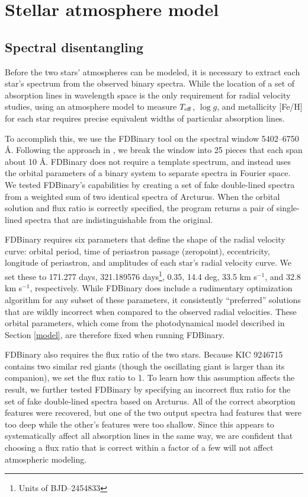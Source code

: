 \section{Stellar atmosphere model}\label{atm}

\subsection{Spectral disentangling}\label{disentangle}
Before the two stars' atmospheres can be modeled, it is necessary to extract each star's spectrum from the observed binary spectra. While the location of a set of absorption lines in wavelength space is the only requirement for radial velocity studies, using an atmosphere model to measure $T_{\rm{eff}}$, $\log g$, and metallicity [Fe/H] for each star requires precise equivalent widths of particular absorption lines.

To accomplish this, we use the FDBinary tool \citep{ili04} on the spectral window 5402--6750 \AA. Following the approach in \citet{bec14}, we break the window into 25 pieces that each span about 10 \AA. FDBinary does not require a template spectrum, and instead uses the orbital parameters of a binary system to separate spectra in Fourier space. We tested FDBinary's capabilities by creating a set of fake double-lined spectra from a weighted sum of two identical spectra of Arcturus. When the orbital solution and flux ratio is correctly specified, the program returns a pair of single-lined spectra that are indistinguishable from the original.

FDBinary requires six parameters that define the shape of the radial velocity curve: orbital period, time of periastron passage (zeropoint), eccentricity, longitude of periastron, and amplitudes of each star's radial velocity curve. We set these to 171.277 days, 321.189576 days\footnote{Units of BJD--2454833}, 0.35, 14.4 deg, 33.5 km s$^{-1}$, and 32.8 km s$^{-1}$, respectively. While FDBinary does include a rudimentary optimization algorithm for any subset of these parameters, it consistently ``preferred'' solutions that are wildly incorrect when compared to the observed radial velocities. These orbital parameters, which come from the photodynamical model described in Section \ref{model}, are therefore fixed when running FDBinary.

FDBinary also requires the flux ratio of the two stars. Because KIC 9246715 contains two similar red giants (though the oscillating giant is larger than its companion), we set the flux ratio to 1. To learn how this assumption affects the result, we further tested FDBinary by specifying an incorrect flux ratio for the set of fake double-lined spectra based on Arcturus. All of the correct absorption features were recovered, but one of the two output spectra had features that were too deep while the other's features were too shallow. Since this appears to systematically affect all absorption lines in the same way, we are confident that choosing a flux ratio that is correct within a factor of a few will not affect atmospheric modeling.

